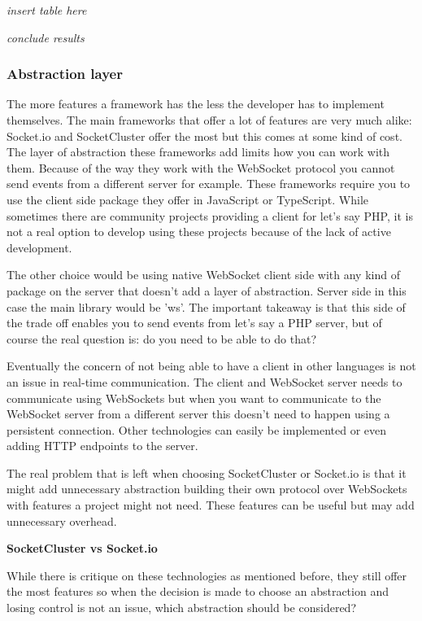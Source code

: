 \textit{insert table here}

\textit{conclude results}

\subsubsection{Abstraction layer}

The more features a framework has the less the developer has to implement themselves. The main frameworks that offer a lot of features are very much alike: Socket.io and SocketCluster offer the most but this comes at some kind of cost. The layer of abstraction these frameworks add limits how you can work with them. Because of the way they work with the WebSocket protocol you cannot send events from a different server for example. These frameworks require you to use the client side package they offer in JavaScript or TypeScript. While sometimes there are community projects providing a client for let's say PHP, it is not a real option to develop using these projects because of the lack of active development.

The other choice would be using native WebSocket client side with any kind of package on the server that doesn't add a layer of abstraction. Server side in this case the main library would be 'ws'. The important takeaway is that this side of the trade off enables you to send events from let's say a PHP server, but of course the real question is: do you need to be able to do that?

Eventually the concern of not being able to have a client in other languages is not an issue in real-time communication. The client and WebSocket server needs to communicate using WebSockets but when you want to communicate to the WebSocket server from a different server this doesn't need to happen using a persistent connection. Other technologies can easily be implemented or even adding HTTP endpoints to the server.

The real problem that is left when choosing SocketCluster or Socket.io is that it might add unnecessary abstraction building their own protocol over WebSockets with features a project might not need. These features can be useful but may add unnecessary overhead.

\textbf{SocketCluster vs Socket.io}

While there is critique on these technologies as mentioned before, they still offer the most features so when the decision is made to choose an abstraction and losing control is not an issue, which abstraction should be considered?

